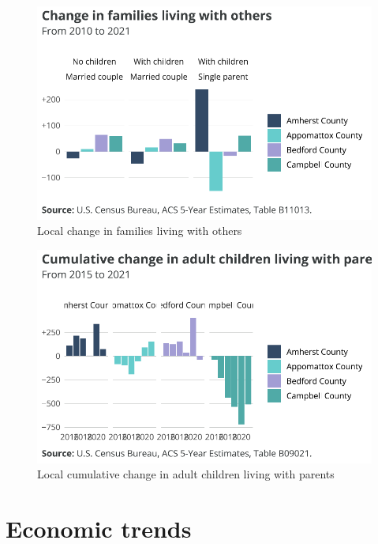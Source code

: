 \documentclass[
  letterpaper,
  DIV=11,
  numbers=noendperiod]{scrreprt}
\begin{document}
\begin{figure}[H]

{\centering \includegraphics{./part-3-2_files/figure-pdf/fig-localsubfam-1.pdf}

}

\caption{\label{fig-localsubfam}Local change in families living with
others}

\end{figure}

\begin{figure}[H]

{\centering \includegraphics{./part-3-2_files/figure-pdf/fig-localachild-1.pdf}

}

\caption{\label{fig-localachild}Local cumulative change in adult
children living with parents}

\end{figure}

\hypertarget{economic-trends-1}{%
\section{Economic trends}\label{economic-trends-1}}
\end{document}

